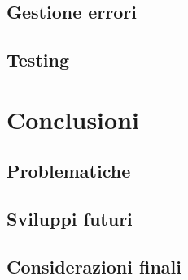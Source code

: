\documentclass[twoside]{supsistudent}
\begin{document}
\section{Gestione errori}

\section{Testing}

\chapter{Conclusioni}

\section{Problematiche}

\section{Sviluppi futuri}

\section{Considerazioni finali}









\end{document}
